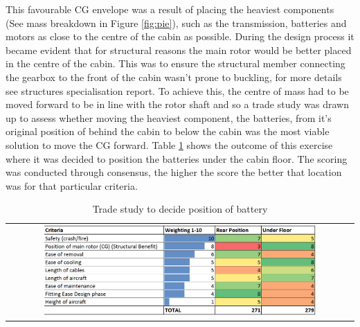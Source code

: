 \documentclass[11pt,a4paper]{article}
\begin{document}
This favourable CG envelope was a result of placing the heaviest components (See mass breakdown in Figure \ref{fig:pie}), such as the transmission, batteries and motors as close to the centre of the cabin as possible. During the design process it became evident that for structural reasons the main rotor would be better placed in the centre of the cabin. This was to ensure the structural member connecting the gearbox to the front of the cabin wasn't prone to buckling, for more details see structures specialisation report. To achieve this, the centre of mass had to be moved forward to be in line with the rotor shaft and so a trade study was drawn up to assess whether moving the heaviest component, the batteries, from it's original position of behind the cabin to below the cabin was the most viable solution to move the CG forward. Table \ref{fig:batterypos} shows the outcome of this exercise where it was decided to position the batteries under the cabin floor. The scoring was conducted through consensus, the higher the score the better that location was for that particular criteria. 

\begin{table}[H]
    \centering
    \caption{Trade study to decide position of battery}
    \begin{tabular}{c}
	\includegraphics[width=0.8\textwidth]{batterypos.PNG}
    \end{tabular}
    \label{fig:batterypos}
\end{table}{}
\end{document}
